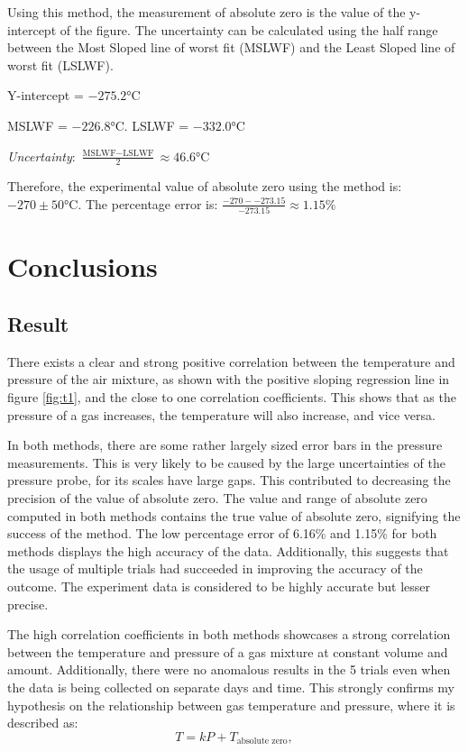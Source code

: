 \documentclass[a4paper,12pt]{article}
\begin{document}
Using this method, the measurement of absolute zero is the value of the y-intercept of the figure. The uncertainty can be calculated using the half range between the Most Sloped line of worst fit (MSLWF) and the Least Sloped line of worst fit (LSLWF).

Y-intercept = $-275.2\si{\celsius}$

MSLWF = $-226.8\si{\celsius}$. LSLWF = $-332.0\si{\celsius}$

\textit{Uncertainty}: $\frac{\text{MSLWF} - \text{LSLWF}}{2} \approx 46.6 \si{\celsius}$

Therefore, the experimental value of absolute zero using the method is: $-270 \pm 50 \si{\celsius}$. The percentage error is: $\frac{-270 - -273.15}{-273.15} \approx 1.15\%$

\section{Conclusions}
\subsection{Result}
There exists a clear and strong positive correlation between the temperature and pressure of the air mixture, as shown with the positive sloping regression line in figure \ref{fig:t1}, and the close to one correlation coefficients. This shows that as the pressure of a gas increases, the temperature will also increase, and vice versa.

In both methods, there are some rather largely sized error bars in the pressure measurements. This is very likely to be caused by the large uncertainties of the pressure probe, for its scales have large gaps. This contributed to decreasing the precision of the value of absolute zero.
The value and range of absolute zero computed in both methods contains the true value of absolute zero, signifying the success of the method. The low percentage error of 6.16\% and 1.15\% for both methods displays the high accuracy of the data. Additionally, this suggests that the usage of multiple trials had succeeded in improving the accuracy of the outcome. The experiment data is considered to be highly accurate but lesser precise.

The high correlation coefficients in both methods showcases a strong correlation between the temperature and pressure of a gas mixture at constant volume and amount. Additionally, there were no anomalous results in the 5 trials even when the data is being collected on separate days and time. This strongly confirms my hypothesis on the relationship between gas temperature and pressure, where it is described as:
\[
    T = kP + T_{\text{absolute zero}},
\]
\end{document}
